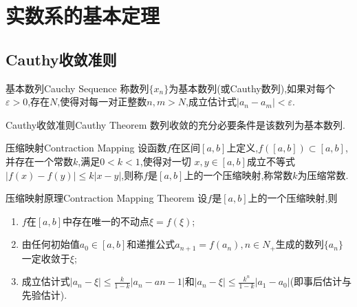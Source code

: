 \documentclass[cn,chinese]{elegantbook}
\begin{document}
    \chapter{实数系的基本定理}
        \section{Cauthy收敛准则}
        
        \begin{definition}{基本数列}{Cauchy Sequence}
            称数列$\{x_n\}$为基本数列(或Cauthy数列),如果对每个$\varepsilon>0$,存在$N$,使得对每一对正整数$n,m>N$,成立估计式$\lvert a_n-a_m\rvert<\varepsilon$.
        \end{definition}
        
        \begin{theorem}{Cauthy收敛准则}{Cauthy Theorem} 
            数列收敛的充分必要条件是该数列为基本数列.
        \end{theorem}
        
        \begin{definition}{压缩映射}{Contraction Mapping}
            设函数$f$在区间$[a,b]$上定义,$f([a,b])\subset [a,b]$,并存在一个常数$k$,满足$0<k<1$,使得对一切 $x,y\in [a,b]$成立不等式$\lvert f(x)-f(y)\rvert\leqslant k\lvert x-y\rvert$,则称$f$是$[a,b]$上的一个压缩映射,称常数$k$为压缩常数.
        \end{definition}
        \begin{theorem}{压缩映射原理}{Contraction Mapping Theorem}
            设$f$是$[a,b]$上的一个压缩映射,则
            \begin{enumerate}
                \item $f$在$[a,b]$中存在唯一的不动点$\xi=f(\xi)$;
                \item 由任何初始值$a_0\in[a,b]$和递推公式$a_{n+1}=f(a_n),n\in N_+$生成的数列$\{a_n\}$一定收敛于$\xi$;
                \item 成立估计式$\lvert a_n-\xi\rvert\leqslant\frac{k}{1-k}\lvert a_n-a{n-1}\rvert$和$\lvert a_n-\xi\rvert\leqslant\frac{k^n}{1-k}\lvert a_1-a_0\rvert$(即事后估计与先验估计).
            \end{enumerate}
        \end{theorem}
\end{document}
